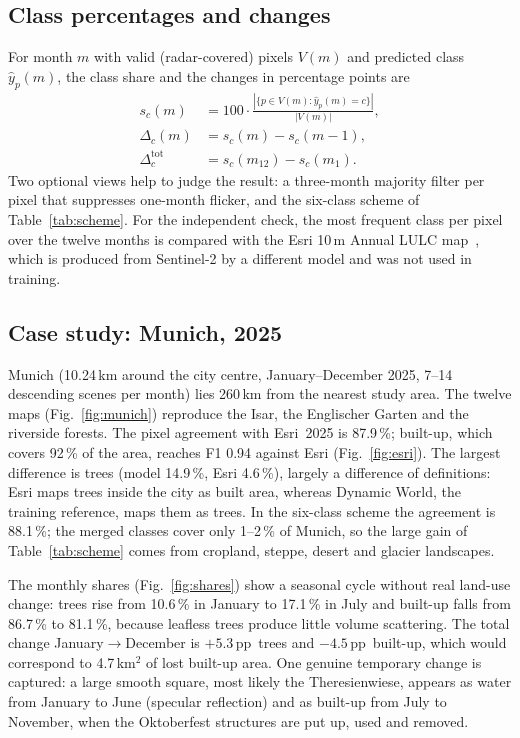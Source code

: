 \documentclass[12pt,conference]{IEEEtran}
\newcommand{\pp}{\,pp}
\begin{document}
\subsection{Class percentages and changes}

For month $m$ with valid (radar-covered) pixels $V(m)$ and predicted class $\hat{y}_p(m)$, the class share and the
changes in percentage points are
\begin{align}
s_c(m)&=100\cdot\frac{|\{p\in V(m):\hat{y}_p(m)=c\}|}{|V(m)|},\\
\Delta_c(m)&=s_c(m)-s_c(m-1),\\
\Delta_c^{\mathrm{tot}}&=s_c(m_{12})-s_c(m_1).
\end{align}
Two optional views help to judge the result: a three-month majority filter per pixel that suppresses one-month
flicker, and the six-class scheme of Table~\ref{tab:scheme}. For the independent check, the most frequent class per
pixel over the twelve months is compared with the Esri 10\,m Annual LULC map~\cite{karra2021global}, which is produced
from Sentinel-2 by a different model and was not used in training.

\subsection{Case study: Munich, 2025}

Munich (10.24\,km around the city centre, January--December 2025, 7--14 descending scenes per month) lies 260\,km
from the nearest study area. The twelve maps (Fig.~\ref{fig:munich}) reproduce the Isar, the Englischer Garten and the
riverside forests. The pixel agreement with Esri~2025 is 87.9\,\%; built-up, which covers 92\,\% of the area, reaches
F1 0.94 against Esri (Fig.~\ref{fig:esri}). The largest difference is trees (model 14.9\,\%, Esri 4.6\,\%), largely a
difference of definitions: Esri maps trees inside the city as built area, whereas Dynamic World, the training reference,
maps them as trees. In the six-class scheme the agreement is 88.1\,\%; the merged classes cover only 1--2\,\% of
Munich, so the large gain of Table~\ref{tab:scheme} comes from cropland, steppe, desert and glacier landscapes.

The monthly shares (Fig.~\ref{fig:shares}) show a seasonal cycle without real land-use change: trees rise from
10.6\,\% in January to 17.1\,\% in July and built-up falls from 86.7\,\% to 81.1\,\%, because leafless trees produce
little volume scattering. The total change January$\to$December is $+5.3$\pp~trees and $-4.5$\pp~built-up, which would
correspond to 4.7\,km$^2$ of lost built-up area. One genuine temporary change is captured: a large smooth square, most
likely the Theresienwiese, appears as water from January to June (specular reflection) and as built-up from July to
November, when the Oktoberfest structures are put up, used and removed.
\end{document}
